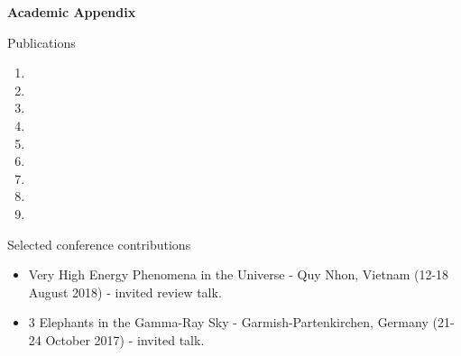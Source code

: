 \hfil{\Large{\bf Academic Appendix}}\hfil\\
\nameskip\break


\begin{rSection}{Publications}
  \begin{NoHyper}
  \begin{enumerate}
    \item {}
    \item {}
    \item {}
    \item {}
    \item {}
    \item {}
    \item {}
    \item {}
    \item {}
  \end{enumerate}
  \end{NoHyper}
\end{rSection}

\begin{rSection}{Selected conference contributions}
  \begin{itemize}
    \item Very High Energy Phenomena in the Universe - Quy Nhon, Vietnam (12-18 August 2018) - invited review talk.
    \item 3 Elephants in the Gamma-Ray Sky - Garmish-Partenkirchen, Germany (21-24 October 2017) - invited talk.
  \end{itemize}

\end{rSection}
